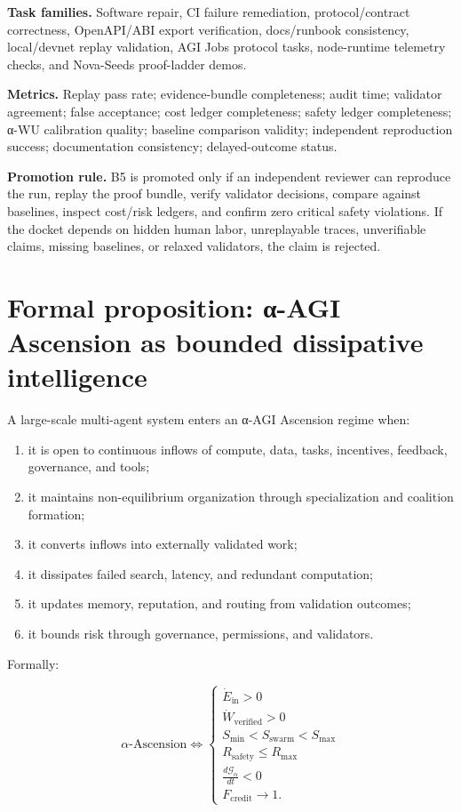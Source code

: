 \textbf{Task families.} Software repair, CI failure remediation,
protocol/contract correctness, OpenAPI/ABI export verification,
docs/runbook consistency, local/devnet replay validation, AGI Jobs
protocol tasks, node-runtime telemetry checks, and Nova-Seeds
proof-ladder demos.

\textbf{Metrics.} Replay pass rate; evidence-bundle completeness; audit
time; validator agreement; false acceptance; cost ledger completeness;
safety ledger completeness; α-WU calibration quality; baseline
comparison validity; independent reproduction success; documentation
consistency; delayed-outcome status.

\textbf{Promotion rule.} B5 is promoted only if an independent reviewer
can reproduce the run, replay the proof bundle, verify validator
decisions, compare against baselines, inspect cost/risk ledgers, and
confirm zero critical safety violations. If the docket depends on hidden
human labor, unreplayable traces, unverifiable claims, missing
baselines, or relaxed validators, the claim is rejected.

\section{Formal proposition: α-AGI Ascension as bounded dissipative
intelligence}\label{formal-proposition-ux3b1-agi-ascension-as-bounded-dissipative-intelligence}

A large-scale multi-agent system enters an α-AGI Ascension regime when:

\begin{enumerate}
\def\labelenumi{\arabic{enumi}.}
\tightlist
\item
  it is open to continuous inflows of compute, data, tasks, incentives,
  feedback, governance, and tools;
\item
  it maintains non-equilibrium organization through specialization and
  coalition formation;
\item
  it converts inflows into externally validated work;
\item
  it dissipates failed search, latency, and redundant computation;
\item
  it updates memory, reputation, and routing from validation outcomes;
\item
  it bounds risk through governance, permissions, and validators.
\end{enumerate}

Formally:

\[
\alpha\text{-Ascension}
\iff
\begin{cases}
\dot{E}_{\text{in}}>0 \\
\dot{W}_{\text{verified}}>0 \\
S_{\min}<S_{\text{swarm}}<S_{\max} \\
R_{\text{safety}}\leq R_{\max} \\
\frac{d\mathcal{G}_{\alpha}}{dt}<0 \\
F_{\text{credit}}\rightarrow 1.
\end{cases}
\]

